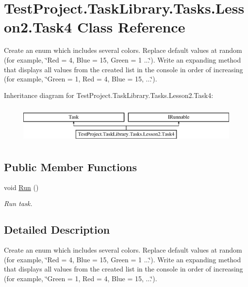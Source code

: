 \hypertarget{class_test_project_1_1_task_library_1_1_tasks_1_1_lesson2_1_1_task4}{}\section{Test\+Project.\+Task\+Library.\+Tasks.\+Lesson2.\+Task4 Class Reference}
\label{class_test_project_1_1_task_library_1_1_tasks_1_1_lesson2_1_1_task4}


Create an enum which includes several colors. Replace default values at random (for example, \char`\"{}\+Red = 4, Blue = 15, Green = 1 ...\char`\"{}). Write an expanding method that displays all values from the created list in the console in order of increasing (for example, \char`\"{}\+Green = 1, Red = 4, Blue = 15, ...\char`\"{}).  


Inheritance diagram for Test\+Project.\+Task\+Library.\+Tasks.\+Lesson2.\+Task4\+:\begin{figure}[H]
\begin{center}
\leavevmode
\includegraphics[height=2.000000cm]{class_test_project_1_1_task_library_1_1_tasks_1_1_lesson2_1_1_task4}
\end{center}
\end{figure}
\subsection*{Public Member Functions}
\begin{DoxyCompactItemize}
\item 
void \mbox{\hyperlink{class_test_project_1_1_task_library_1_1_tasks_1_1_lesson2_1_1_task4_a6690ba8e985b4db429e194964ddf20be}{Run}} ()
\begin{DoxyCompactList}\small\item\em Run task. \end{DoxyCompactList}\end{DoxyCompactItemize}


\subsection{Detailed Description}
Create an enum which includes several colors. Replace default values at random (for example, \char`\"{}\+Red = 4, Blue = 15, Green = 1 ...\char`\"{}). Write an expanding method that displays all values from the created list in the console in order of increasing (for example, \char`\"{}\+Green = 1, Red = 4, Blue = 15, ...\char`\"{}). 



